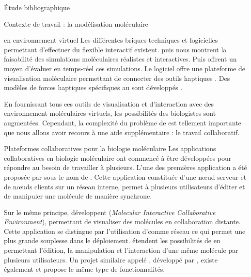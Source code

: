 \documentclass[myfrancais,ngerman,english,french]{mythesis}
\begin{document}
\begin{mychapter}{Étude bibliographique}
\begin{mysection}{Contexte de travail : la modélisation moléculaire}
\begin{mysubsection}{ en environnement virtuel}
				Les différentes briques techniques et logicielles permettant d'effectuer du  flexible interactif existent.
				 puis  nous montrent la faisabilité des simulations moléculaires réalistes et interactives.
				Puis  offrent un moyen d'évaluer en temps-réel ces simulations.
				Le logiciel  offre une plateforme de visualisation moléculaire permettant de connecter des outils haptiques .
				Des modèles de forces haptiques spécifiques au  sont développés .

				En fournissant tous ces outils de visualisation et d'interaction avec des environnement moléculaires virtuels, les possibilités des biologistes sont augmentées.
				Cependant, la complexité du problème de  est tellement importante que nous allons avoir recours à une aide supplémentaire : le travail collaboratif.

				\begin{myfigure}
				\end{myfigure}
			\end{mysubsection}
			\begin{mysubsection}{Plateformes collaboratives pour la biologie moléculaire}
				Les applications collaboratives en biologie moléculaire ont commencé à être développées pour répondre au besoin de travailler à plusieurs.
				L'une des premières application a été proposée par  sous le nom de \myEyeChem.
				Cette application constituée d'une nœud serveur et de nœuds clients sur un réseau interne, permet à plusieurs utilisateurs d'éditer et de manipuler une molécule de manière synchrone.

				Sur le même principe,  développent \myMICE (\textit{Molecular Interactive Collaborative Environment}), permettant de visualiser des molécules en collaboration distante.
				Cette application se distingue par l'utilisation d'\myInternet comme réseau ce qui permet une plus grande souplesse dans le déploiement.
				 étendent les possibilités de \myMICE en permettant l'édition, la manipulation et l'interaction d'une même molécule par plusieurs utilisateurs.
				Un projet similaire appelé \myChimera, développé par , existe également et propose le même type de fonctionnalités.


\end{mysubsection}
\end{mysection}
\end{mychapter}
\end{document}
